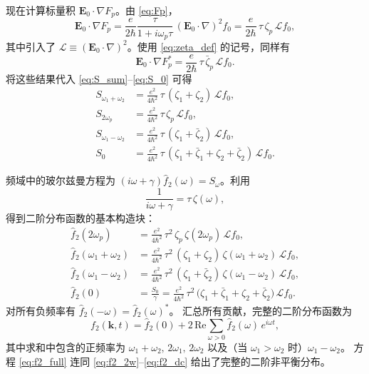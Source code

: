 现在计算标量积 \(\mathbf{E}_0\!\cdot\!\nabla F_p\)。由 \eqref{eq:Fp}，
\[
\mathbf{E}_0\!\cdot\!\nabla F_p = \frac{e}{2\hbar}\frac{\tau}{1+i\omega_p\tau}\, (\mathbf{E}_0\!\cdot\!\nabla)^2 f_0
= \frac{e}{2\hbar}\,\tau\,\zeta_p\,\mathcal{L}f_0,
\]
其中引入了 \(\mathcal{L} \equiv (\mathbf{E}_0\!\cdot\!\nabla)^2\)。使用 \eqref{eq:zeta_def} 的记号，同样有
\[
\mathbf{E}_0\!\cdot\!\nabla F_p^* = \frac{e}{2\hbar}\,\tau\,\bar\zeta_p\,\mathcal{L}f_0.
\]
将这些结果代入 \eqref{eq:S_sum}--\eqref{eq:S_0} 可得
\begin{align}
S_{\omega_1+\omega_2} &= \frac{e^2}{4\hbar^2}\,\tau\,(\zeta_1+\zeta_2)\,\mathcal{L}f_0, \label{eq:S_sum2}\\
S_{2\omega_p} &= \frac{e^2}{4\hbar^2}\,\tau\,\zeta_p\,\mathcal{L}f_0, \label{eq:S_2w2}\\
S_{\omega_1-\omega_2} &= \frac{e^2}{4\hbar^2}\,\tau\,(\zeta_1+\bar\zeta_2)\,\mathcal{L}f_0, \label{eq:S_diff2}\\
S_0 &= \frac{e^2}{4\hbar^2}\,\tau\,(\zeta_1+\bar\zeta_1+\zeta_2+\bar\zeta_2)\,\mathcal{L}f_0. \label{eq:S_02}
\end{align}

频域中的玻尔兹曼方程为 \((i\omega+\gamma)\hat f_2(\omega) = S_\omega\)。利用
\[
\frac{1}{i\omega+\gamma} = \tau\,\zeta(\omega),
\]
得到二阶分布函数的基本构造块：
\begin{align}
\hat f_2(2\omega_p) &= \frac{e^2}{4\hbar^2}\,\tau^2\,\zeta_p\,\zeta(2\omega_p)\,\mathcal{L}f_0, \label{eq:f2_2w}\\[4pt]
\hat f_2(\omega_1+\omega_2) &= \frac{e^2}{4\hbar^2}\,\tau^2\,(\zeta_1+\zeta_2)\,
  \zeta(\omega_1+\omega_2)\,\mathcal{L}f_0, \label{eq:f2_sum}\\[4pt]
\hat f_2(\omega_1-\omega_2) &= \frac{e^2}{4\hbar^2}\,\tau^2\,(\zeta_1+\bar\zeta_2)\,
  \zeta(\omega_1-\omega_2)\,\mathcal{L}f_0, \label{eq:f2_diff}\\[4pt]
\hat f_2(0) &= \frac{S_0}{\gamma}
            = \frac{e^2}{4\hbar^2}\,\tau^2\,
            \big(\zeta_1+\bar\zeta_1+\zeta_2+\bar\zeta_2\big)\,\mathcal{L}f_0. \label{eq:f2_dc}
\end{align}
对所有负频率有 \(\hat f_2(-\omega) = \hat f_2(\omega)^*\)。
汇总所有贡献，完整的二阶分布函数为
\begin{equation}
f_2(\mathbf{k},t) = \hat f_2(0) + 2\,\mathrm{Re}\!\sum_{\omega>0} \hat f_2(\omega)\, e^{i\omega t},
\label{eq:f2_full}
\end{equation}
其中求和中包含的正频率为 \(\omega_1+\omega_2,\,2\omega_1,\,2\omega_2\) 以及（当 \(\omega_1>\omega_2\) 时）\(\omega_1-\omega_2\)。
方程 \eqref{eq:f2_full} 连同 \eqref{eq:f2_2w}--\eqref{eq:f2_dc} 给出了完整的二阶非平衡分布。

